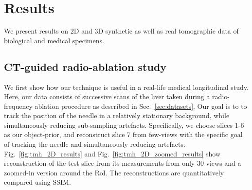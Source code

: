 \documentclass[journal]{IEEEtran}
\begin{document}
\section{Results}
\label{sec:results_spatially_varying_prior}
We present results on 2D and 3D synthetic as well as real
tomographic data of biological and medical specimens.

\subsection{\textbf{CT-guided radio-ablation study}}
\label{sec:tmh}

We first show how our technique is useful in a
real-life medical longitudinal study. Here, our data consists of
successive scans of the liver taken during a radio-frequency ablation
procedure as described in Sec.~\ref{sec:datasets}. Our goal is to to
track the position of the needle in a relatively stationary
background, while simultaneously reducing sub-sampling artefacts.
Specifically, we choose slices 1-6 as our object-prior, and
reconstruct slice 7 from few-views with the specific goal of tracking
the needle and simultaneously reducing
artefacts. Fig.~\ref{fig:tmh_2D_results} and
Fig.~\ref{fig:tmh_2D_zoomed_results} show reconstruction of the test
slice from its measurements from only 30 views and a zoomed-in version
around the RoI. The reconstructions are quantitatively compared using
SSIM.
\end{document}
